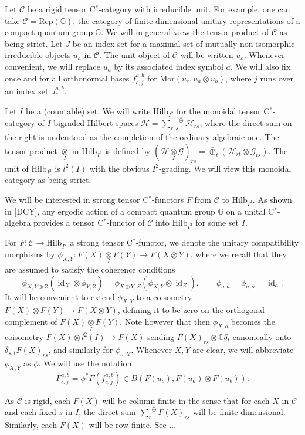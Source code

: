 \documentclass[12pt]{article}
\theoremstyle{change}
\DeclareMathOperator{\id}{id}
\newcommand{\G}{\mathbb{G}}
\newcommand{\C}{\mathbb{C}}
\newcommand{\Hsp}{\mathscr{H}}
\newcommand{\CatC}{\mathcal{C}}
\newcommand{\Hilb}{\mathrm{Hilb}}
\newcommand{\Mor}{\mathrm{Mor}}
\newcommand{\iitimes}{\underset{I}{\otimes}}
\newcommand{\osum}[1]{\underset{#1}{\sum}^{\oplus}}
\newcommand{\osumc}[1]{\underset{#1}{\sum}^{\bar{\oplus}}}
\newcommand{\oplusc}{\bar{\oplus}}
\newcommand{\Rep}{\mathrm{Rep}}
\theoremstyle{definition}
\numberwithin{equation}{section}
\begin{document}
Let $\CatC$ be a rigid tensor C$^*$-category with irreducible unit. For example, one can take $\CatC = \Rep(\G)$, the category of finite-dimensional unitary representations of a compact quantum group $\G$. We will in general view the tensor product of $\CatC$ as being strict. Let $J$ be an index set for a maximal set of mutually non-isomorphic irreducible objects $u_a$ in $\CatC$. The unit object of $\CatC$ will be written $u_o$. Whenever convenient, we will replace $u_a$ by its associated index symbol $a$. We will also fix once and for all orthonormal bases $f_{c,j}^{a,b}$ for $\Mor(u_c,u_a\otimes u_b)$, where $j$ runs over an index set $J^{a,b}_{c}$.

Let $I$ be a (countable) set. We will write $\Hilb_{I^2}$ for the monoidal tensor C$^*$-category of $I$-bigraded Hilbert spaces $\Hsp = \osumc{r,s}\Hsp_{rs}$, where the direct sum on the right is understood as the completion of the ordinary algebraic one. The tensor product $\iitimes$ in $\Hilb_{I^2}$ is defined by $(\Hsp\iitimes \mathscr{G})_{rs} = \oplusc_t \left(\Hsp_{rt}\otimes\mathscr{G}_{ts}\right)$. The unit of $\Hilb_{I^2}$ is $l^2(I)$ with the obvious $I^2$-grading. We will view this monoidal category as being strict.

We will be interested in strong tensor C$^*$-functors $F$ from $\CatC$ to $\Hilb_{I^2}$. As shown in [DCY], any ergodic action of a compact quantum group $\G$ on a unital C$^*$-algebra provides a tensor C$^*$-functor of $\CatC$ into $\Hilb_{I^2}$ for some set $I$.

For $F: \CatC\rightarrow \Hilb_{I^2}$ a strong tensor C$^*$-functor, we denote the unitary compatibility morphisms by $\phi_{X,Y}:F(X)\iitimes F(Y)\rightarrow F(X\otimes Y)$, where we recall that they are assumed to satisfy the coherence conditions  \[\phi_{X,Y\otimes Z}(\id_X\otimes \phi_{Y,Z}) = \phi_{X\otimes Y,Z}(\phi_{X,Y}\otimes \id_Z),\qquad \phi_{o,a} = \phi_{a,o} = \id_a.\] It will be convenient to extend $\phi_{X,Y}$ to a coisometry $F(X)\otimes F(Y)\rightarrow F(X\otimes Y)$, defining it to be zero on the orthogonal complement of $F(X)\iitimes F(Y)$. Note however that then $\phi_{X,o}$ becomes the coisometry $F(X)\otimes l^2(I)\rightarrow F(X)$ sending $F(X)_{rs} \otimes \C\delta_t$ canonically onto $\delta_{s,t}F(X)_{rs}$, and similarly for $\phi_{o,X}$. Whenever $X,Y$ are clear, we will abbreviate $\phi_{X,Y}$ as $\phi$. We will use the notation \[F^{a,b}_{c,j} = \phi^* F(f^{a,b}_{c,j}) \in B(F(u_c),F(u_a)\otimes F(u_b)).\]

As $\CatC$ is rigid, each $F(X)$ will be column-finite in the sense that for each $X$ in $\CatC$ and each fixed $s$ in $I$, the direct sum $\osum{r} F(X)_{rs}$ will be finite-dimensional. Similarly, each $F(X)$ will be row-finite. See ...
\end{document}
